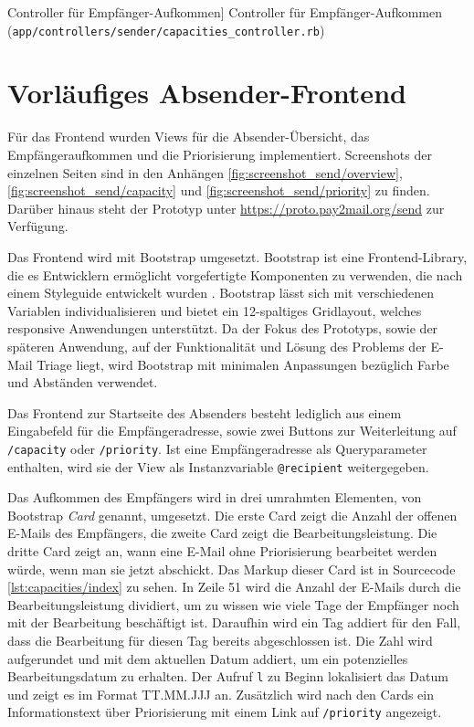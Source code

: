 \begin{listing}[!ht]
\inputminted[linenos]{ruby}{Listings/Prototype/capacities_controller.rb}

\caption
    [Controller für Empfänger-Aufkommen]
    {Controller für Empfänger-Aufkommen (\texttt{app/controllers/sender/capacities\_controller.rb})}

\label{lst:capacities_controller}
\end{listing}

\section{Vorläufiges Absender-Frontend}
Für das Frontend wurden Views für die Absender-Übersicht, das Empfängeraufkommen und die Priorisierung implementiert. Screenshots der einzelnen Seiten sind in den Anhängen \ref{fig:screenshot_send/overview}, \ref{fig:screenshot_send/capacity} und \ref{fig:screenshot_send/priority} zu finden. Darüber hinaus steht der Prototyp unter \url{https://proto.pay2mail.org/send} zur Verfügung.

Das Frontend wird mit Bootstrap umgesetzt. Bootstrap ist eine Frontend-Library, die es Entwicklern ermöglicht vorgefertigte Komponenten zu verwenden, die nach einem Styleguide entwickelt wurden \citep{Twitter2022}. Bootstrap lässt sich mit verschiedenen Variablen individualisieren und bietet ein 12-spaltiges Gridlayout, welches responsive Anwendungen unterstützt. Da der Fokus des Prototyps, sowie der späteren Anwendung, auf der Funktionalität und Lösung des Problems der E-Mail Triage liegt, wird Bootstrap mit minimalen Anpassungen bezüglich Farbe und Abständen verwendet.

Das Frontend zur Startseite des Absenders besteht lediglich aus einem Eingabefeld für die Empfängeradresse, sowie zwei Buttons zur Weiterleitung auf \texttt{/capacity} oder \texttt{/priority}. Ist eine Empfängeradresse als Queryparameter enthalten, wird sie der View als Instanzvariable \texttt{@recipient} weitergegeben.

Das Aufkommen des Empfängers wird in drei umrahmten Elementen, von Bootstrap \textit{Card} genannt, umgesetzt. Die erste Card zeigt die Anzahl der offenen E-Mails des Empfängers, die zweite Card zeigt die Bearbeitungsleistung. Die dritte Card zeigt an, wann eine E-Mail ohne Priorisierung bearbeitet werden würde, wenn man sie jetzt abschickt. Das Markup dieser Card ist in Sourcecode \ref{lst:capacities/index} zu sehen. In Zeile 51 wird die Anzahl der E-Mails durch die Bearbeitungsleistung dividiert, um zu wissen wie viele Tage der Empfänger noch mit der Bearbeitung beschäftigt ist. Daraufhin wird ein Tag addiert für den Fall, dass die Bearbeitung für diesen Tag bereits abgeschlossen ist. Die Zahl wird aufgerundet und mit dem aktuellen Datum addiert, um ein potenzielles Bearbeitungsdatum zu erhalten. Der Aufruf \texttt{l} zu Beginn lokalisiert das Datum und zeigt es im Format TT.MM.JJJ an. Zusätzlich wird nach den Cards ein Informationstext über Priorisierung mit einem Link auf \texttt{/priority} angezeigt.

